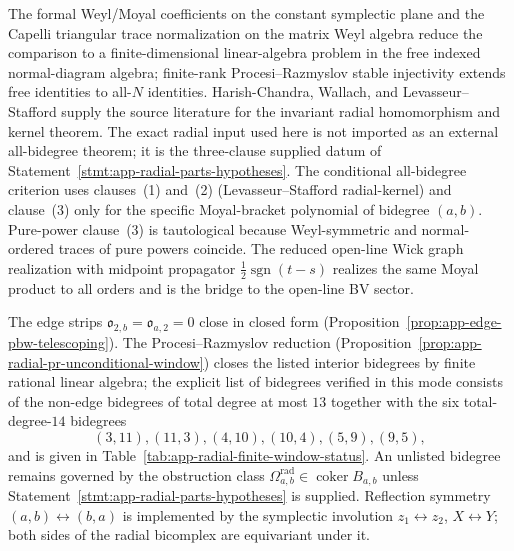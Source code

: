The formal Weyl/Moyal coefficients on the constant symplectic plane
and the Capelli triangular trace normalization on the matrix Weyl
algebra reduce the comparison to a finite-dimensional linear-algebra
problem in the free indexed normal-diagram algebra; finite-rank
Procesi--Razmyslov stable injectivity extends free identities to
all-\(N\) identities.  Harish-Chandra, Wallach, and
Levasseur--Stafford
\cite{harish-chandra-invariant-differential-operators}
\cite{wallach-reductive-invariant-differential}
\cite{levasseur-stafford-harish-chandra}
\cite{levasseur-stafford-kernel-harish-chandra} supply the source
literature for the invariant radial homomorphism and kernel theorem.
The exact radial input used here is not imported as an external
all-bidegree theorem; it is the three-clause supplied datum of
Statement~\ref{stmt:app-radial-parts-hypotheses}.  The conditional
all-bidegree criterion uses clauses~(1) and~(2) (Levasseur--Stafford
radial-kernel) and clause~(3) only for the specific Moyal-bracket
polynomial of bidegree \((a,b)\).  Pure-power clause~(3) is
tautological because Weyl-symmetric and normal-ordered traces of
pure powers coincide.  The reduced open-line Wick graph realization
with midpoint propagator \(\tfrac12\operatorname{sgn}(t-s)\)
realizes the same Moyal product to all orders and is the bridge to
the open-line BV sector.

The edge strips \(\mathfrak o_{2,b}=\mathfrak o_{a,2}=0\) close in
closed form (Proposition~\ref{prop:app-edge-pbw-telescoping}).  The
Procesi--Razmyslov reduction
(Proposition~\ref{prop:app-radial-pr-unconditional-window}) closes
the listed interior bidegrees by finite rational linear algebra; the
explicit list of bidegrees verified in this mode
consists of the non-edge bidegrees of total degree at most \(13\)
together with the six total-degree-\(14\) bidegrees
\[
  (3,11),(11,3),(4,10),(10,4),(5,9),(9,5),
\]
and is given in Table~\ref{tab:app-radial-finite-window-status}.
An unlisted bidegree remains governed by the obstruction class
\(\Omega^{\mathrm{rad}}_{a,b}\in\operatorname{coker}B_{a,b}\) unless
Statement~\ref{stmt:app-radial-parts-hypotheses} is supplied.  Reflection
symmetry \((a,b)\leftrightarrow(b,a)\) is implemented by the
symplectic involution \(z_1\leftrightarrow z_2\),
\(X\leftrightarrow Y\); both sides of the radial bicomplex are
equivariant under it.

